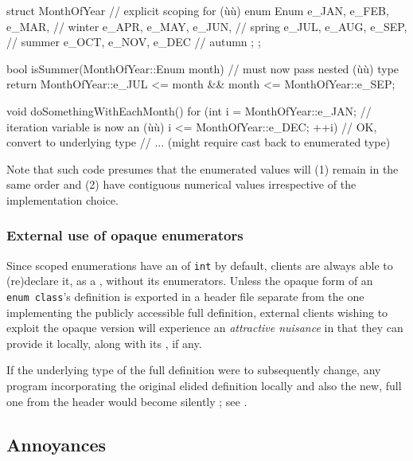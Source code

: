 \begin{emcppslisting}
struct MonthOfYear  // explicit scoping for (ù{}ù)
{
    enum Enum
    {
        e_JAN, e_FEB, e_MAR,  // winter
        e_APR, e_MAY, e_JUN,  // spring
        e_JUL, e_AUG, e_SEP,  // summer
        e_OCT, e_NOV, e_DEC   // autumn
    };
};

bool isSummer(MonthOfYear::Enum month)  // must now pass nested (ù{}ù) type
{
    return MonthOfYear::e_JUL <= month && month <= MonthOfYear::e_SEP;
}

void doSomethingWithEachMonth()
{
    for (int i =  MonthOfYear::e_JAN;  // iteration variable is now an (ù{}ù)
             i <= MonthOfYear::e_DEC;
           ++i)  // OK, convert to underlying type
    {
        // ... (might require cast back to enumerated type)
    }
}
\end{emcppslisting}

\noindent Note that such code presumes that the enumerated values will (1) remain
in the same order and (2) have contiguous numerical values irrespective
of the implementation choice.

\subsubsection[External use of opaque enumerators]{External use of opaque enumerators}\label{external-use-of-opaque-enumerators-enumclass}

Since scoped enumerations have an  of \lstinline!int! by default, clients are always able to (re)declare
it, as a , without its enumerators. Unless the
opaque form of an \lstinline!enum!~\lstinline!class!'s definition is exported
in a header file separate from the one implementing the publicly
accessible full definition, external clients wishing to exploit the
opaque version will experience an \emph{attractive nuisance} in that
they can provide it locally, along with its , if
any.

If the underlying type of the full definition were to subsequently
change, any program incorporating the original elided definition locally
and also the new, full one from the header would become silently ; see .

\subsection[Annoyances]{Annoyances}\label{annoyances-enumclass}

